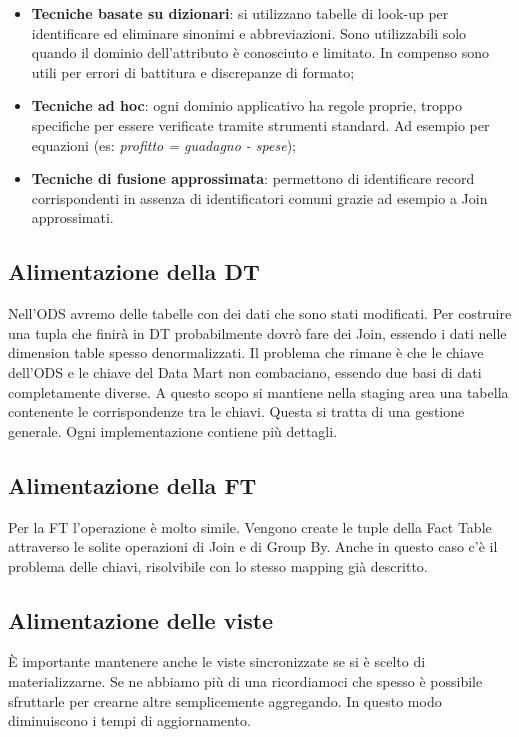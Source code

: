 \begin{itemize}
	\item \textbf{Tecniche basate su dizionari}: si utilizzano tabelle di look-up per identificare ed eliminare sinonimi e abbreviazioni. Sono utilizzabili solo quando il dominio dell'attributo è conosciuto e limitato. In compenso sono utili per errori di battitura e discrepanze di formato;
	\item \textbf{Tecniche ad hoc}: ogni dominio applicativo ha regole proprie, troppo specifiche per essere verificate tramite strumenti standard. Ad esempio per equazioni (es: \textit{profitto = guadagno - spese});
	\item \textbf{Tecniche di fusione approssimata}: permettono di identificare record corrispondenti in assenza di identificatori comuni grazie ad esempio a Join approssimati.
\end{itemize}

\subsection{Alimentazione della DT}
Nell'ODS avremo delle tabelle con dei dati che sono stati modificati. Per costruire una tupla che finirà in DT probabilmente dovrò fare dei Join, essendo i dati nelle dimension table spesso denormalizzati. Il problema che rimane è che le chiave dell'ODS e le chiave del Data Mart non combaciano, essendo due basi di dati completamente diverse. A questo scopo si mantiene nella staging area una tabella contenente le corrispondenze tra le chiavi. Questa si tratta di una gestione generale. Ogni implementazione contiene più dettagli.


\subsection{Alimentazione della FT}
Per la FT l'operazione è molto simile. Vengono create le tuple della Fact Table attraverso le solite operazioni di Join e di Group By. Anche in questo caso c'è il problema delle chiavi, risolvibile con lo stesso mapping già descritto.


\subsection{Alimentazione delle viste}
È importante mantenere anche le viste sincronizzate se si è scelto di materializzarne. Se ne abbiamo più di una ricordiamoci che spesso è possibile sfruttarle per crearne altre semplicemente aggregando. In questo modo diminuiscono i tempi di aggiornamento.
